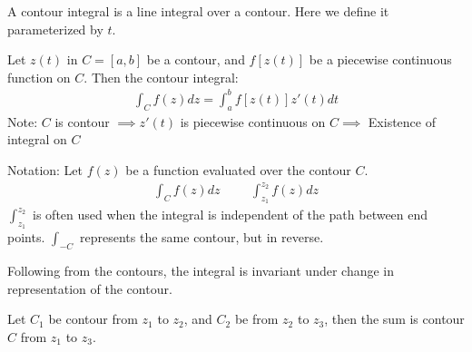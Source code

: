 \documentclass[12pt, english]{book}
\begin{document}
	A contour integral is a line integral over a contour. Here we define it parameterized by \(t\).
	
	\begin{definition}
		\label{Contour Integral Definition - Complex}
		Let \(z(t)\) in \(C = [a, b]\) be a contour, and \(f[z(t)]\) be a piecewise continuous function on \(C\). Then the contour integral:
		\begin{align*}
			\int_{C} f(z) dz = \int_{a}^{b} f[z(t)] z'(t) dt
		\end{align*}
		Note: \(C\) is contour \(\implies z'(t)\) is piecewise continuous on \(C \implies\) Existence of integral on \(C\)
	\end{definition}
	
	Notation: 
	Let \(f(z)\) be a function evaluated over the contour \(C\).
	\begin{align*}
		\int_{C} f(z) dz &&& \int_{z_1}^{z_2} f(z) dz
	\end{align*}
	\(\int_{z_1}^{z_2}\) is often used when the integral is independent of the path between end points. \(\int_{-C}\) represents the same contour, but in reverse.
	
	Following from the contours, the integral is invariant under change in representation of the contour. 
	
	\begin{definition}
		\label{Sum (Contour) Definition - Complex}
		Let \(C_1\) be contour from \(z_1\) to \(z_2\), and \(C_2\) be from \(z_2\) to \(z_3\), then the sum is contour \(C\) from \(z_1\) to \(z_3\).
	\end{definition}

	\begin{figure}[H]
		\centering
	\end{figure}
	
\end{document}
